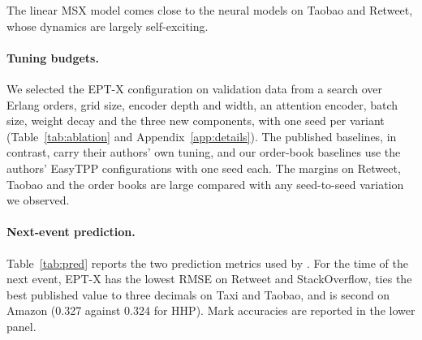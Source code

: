 The linear MSX model comes close to the neural models on Taobao and Retweet, whose dynamics are
largely self-exciting.

\paragraph{Tuning budgets.} We selected the EPT-X configuration on validation data from a search
over Erlang orders, grid size, encoder depth and width, an attention encoder, batch size, weight
decay and the three new components, with one seed per variant (Table~\ref{tab:ablation} and
Appendix~\ref{app:details}). The published baselines, in contrast, carry their authors' own tuning,
and our order-book baselines use the authors' EasyTPP configurations with one seed each. The
margins on Retweet, Taobao and the order books are large compared with any seed-to-seed variation
we observed.

\begin{table}[!htbp]\centering\small
\caption{Public benchmarks: test log-likelihood per event (higher is better). Published
numbers are from \citet{chang2025deep} and \citet{boyd2025hyper}. Our rows give the mean $\pm$ s.d.\ over
seeds (EPT-X: \eptxSeeds; other rows one seed), and the EPT-X configuration is selected per
dataset on validation. Bold: best; underlined: second best; shaded: our models.}
\label{tab:track-b}
\setlength{\tabcolsep}{5pt}

\end{table}

\paragraph{Next-event prediction.} Table~\ref{tab:pred} reports the two prediction metrics used by
\citet{chang2025deep}. For the time of the next event, EPT-X has the lowest RMSE on Retweet and
StackOverflow, ties the best published value to three decimals on Taxi and Taobao, and is second on
Amazon (0.327 against 0.324 for HHP). Mark accuracies are reported in the lower panel.

\begin{table}[!htbp]\centering\small
\caption{Next-event prediction on the public benchmarks: time RMSE (top, lower is better; Retweet
in seconds) and mark accuracy (bottom, \%, higher is better). Published numbers from
\citet{chang2025deep} and \citet{boyd2025hyper}, Table~2(b,c) of each. EPT-X: mean $\pm$ s.d.\ over seeds of the
validation-selected configuration. Bold: best; underlined: second best; shaded: ours.}\label{tab:pred}
\setlength{\tabcolsep}{5pt}
\\[6pt]

\end{table}

